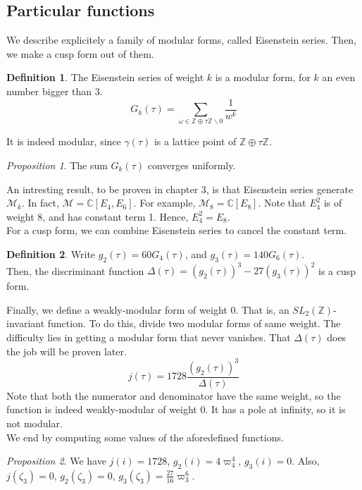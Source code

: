 \documentclass[11pt]{article}
\theoremstyle{definition}
\newtheorem{definition}{Definition}[section]
\theoremstyle{example}
\theoremstyle{remark}
\theoremstyle{lemma}
\theoremstyle{proposition}
\newtheorem{proposition}{Proposition}[section]
\theoremstyle{Problem}
\theoremstyle{Solution}
\theoremstyle{theorem}
\theoremstyle{corollary}
\begin{document}
\subsection{Particular functions}
We describe explicitely a family of modular forms, called Eisenstein series. Then, we make a cusp form out of them.\\
\begin{definition}
The Eisenstein series of weight $k$ is a modular form, for $k$ an even number bigger than $3$.
$$G_k(\tau) = \sum_{\omega\in\mathbb{Z}\oplus\tau\mathbb{Z}\backslash 0} \frac{1}{w^k}$$
\end{definition}
It is indeed modular, since $\gamma(\tau)$ is a lattice point of $\mathbb{Z}\oplus\tau\mathbb{Z}$.\\
\begin{proposition}
The sum $G_k(\tau)$ converges uniformly.
\end{proposition}
An intresting result, to be proven in chapter 3, is that Eisenstein series generate $\mathcal{M}_k$. In fact, $\mathcal{M} = \mathbb{C}[E_4,E_6]$. For example, $\mathcal{M}_8 = \mathbb{C}[E_8]$. Note that $E_4^2$ is of weight $8$, and has constant term 1. Hence, $E_4^2 = E_8$.\\
For a cusp form, we can combine Eisenstein series to cancel the constant term. 
\begin{definition}
Write $g_2(\tau) = 60G_4(\tau)$, and $g_3(\tau) = 140G_6(\tau)$.\\
Then, the discriminant function $\Delta(\tau) = (g_2(\tau))^3 - 27(g_3(\tau))^2$ is a cusp form.
\end{definition}
Finally, we define a weakly-modular form of weight $0$. That is, an $SL_2(\mathbb{Z})$-invariant function. To do this, divide two modular forms of same weight. The difficulty lies in getting a modular form that never vanishes. That $\Delta(\tau)$ does the job will be proven later.
$$j(\tau)=1728\frac{(g_2(\tau))^3}{\Delta(\tau)}$$
 Note that both the numerator and denominator have the same weight, so the function is indeed weakly-modular of weight $0$. It has a pole at infinity, so it is not modular.\\
We end by computing some values of the aforedefined functions.
\begin{proposition}
We have $j(i) = 1728$, $g_2(i)=4\varpi_4^4$, $g_3(i) = 0$.
Also, $j(\zeta_3) = 0$, $g_2(\zeta_3)=0$, $g_3(\zeta_3) = \frac{27}{16}\varpi_3^6$.
\end{proposition}
\end{document}
